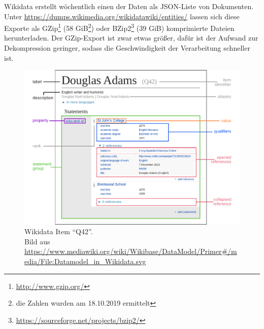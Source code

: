 Wikidata erstellt wöchentlich einen  der Daten als JSON-Liste von Dokumenten.
Unter \url{https://dumps.wikimedia.org/wikidatawiki/entities/} lassen sich diese Exporte als GZip\footnote{\url{http://www.gzip.org/}} (58 GiB\footnote{die Zahlen wurden am 18.10.2019 ermittelt}) oder BZip2\footnote{\url{https://sourceforge.net/projects/bzip2/}} (39 GiB) komprimierte Dateien herunterladen.
Der GZip-Export ist zwar etwas größer, dafür ist der Aufwand zur Dekompression geringer, sodass die Geschwindigkeit der Verarbeitung schneller ist.

\begin{figure}
  \includegraphics[width=\linewidth]{pics/Datamodel_in_Wikidata}
  \caption[Wikidata Item "`Q42"']{Wikidata Item "`Q42"'. \\ \small{Bild aus \url{https://www.mediawiki.org/wiki/Wikibase/DataModel/Primer\#/media/File:Datamodel_in_Wikidata.svg}}}
  \label{fig:wd-datamodel}
\end{figure}

